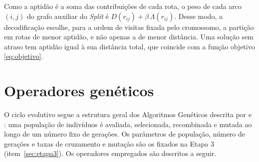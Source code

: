 Como a aptidão é a soma das contribuições de cada rota, o peso de cada arco $(i, j)$ do
grafo auxiliar do \textit{Split} é $D(r_{ij}) + \beta \, \Lambda(r_{ij})$. Desse modo, a
decodificação escolhe, para a ordem de visitas fixada pelo cromossomo, a partição em
rotas de menor aptidão, e não apenas a de menor distância. Uma solução sem atraso tem
aptidão igual à sua distância total, que coincide com a função objetivo
\eqref{eq:objetivo}.

\section{Operadores genéticos}
\label{sec:operadores}

O ciclo evolutivo segue a estrutura geral dos Algoritmos Genéticos descrita por
 e : uma população de indivíduos é
avaliada, selecionada, recombinada e mutada ao longo de um número fixo de gerações. Os
parâmetros de população, número de gerações e taxas de cruzamento e mutação são os
fixados na Etapa 3 (item~\ref{sec:etapa3}). Os operadores empregados são descritos a
seguir.

